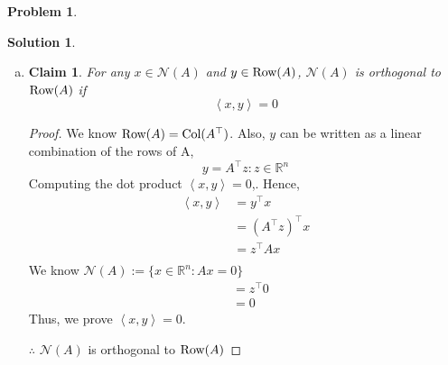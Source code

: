 \documentclass{amsart}[11pt]
\newtheorem{claim}[theorem]{Claim}
\theoremstyle{definition}
\newtheorem{problem}{Problem}
\newtheorem{solution}{Solution}
\newcommand{\R}{\mathbb{R}}
\newcommand{\bracket}[1]{\left\langle#1\right\rangle}
\newcommand{\col}{\textnormal{Col}}
\newcommand{\row}{\textnormal{Row}}
\begin{document}
\begin{problem}
\begin{solution}
\begin{enumerate}[(a)]
\begin{proof}
            \noindent Since both inclusions hold, we can conclude $\boldsymbol{\mathcal{N}(A^\top A)=\mathcal{N}(A)}$.
        \end{proof}
        \vspace{\baselineskip}
        \item \begin{claim}
        For any $x\in\mathcal{N}(A)$ and $y\in \row(A)$, $\mathcal{N}(A)$ is orthogonal to $\row(A)$ if
        \[\bracket{x,y}=0\]
        \end{claim}
        \begin{proof}
            We know $\row(A) = \col(A^\top)$. Also, $y$ can be written as a linear combination of the rows of A, 
            \[y=A^\top z : z\in\R^n\]
            Computing the dot product $\bracket{x,y} = 0$,. Hence, 
            \begin{align*}
            	\bracket{x,y} &= y^\top x \\
                &= (A^\top z)^\top x \\
                &= z^\top Ax \\
            \end{align*}
            We know $\mathcal{N}(A):=\{x\in\R^n:Ax=0\}$
            \begin{align*}
                &= z^\top 0 \\
                &= 0 
            \end{align*}
            Thus, we prove $\bracket{x,y} = 0$. 
            
            \noindent $\therefore$ $\mathcal{N}(A)$ is orthogonal to $\row(A)$ 
        \end{proof}
    \end{enumerate}
\end{solution}
\end{problem}
\end{document}
